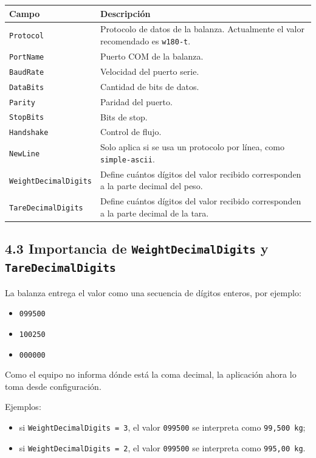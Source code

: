 \documentclass[12pt,a4paper]{article}
\begin{document}
\begin{longtable}{|>{\raggedright\arraybackslash}p{4cm}|>{\raggedright\arraybackslash}p{10cm}|}
\hline
\textbf{Campo} & \textbf{Descripci\'on} \\
\hline
\texttt{Protocol} & Protocolo de datos de la balanza. Actualmente el valor recomendado es \texttt{w180-t}. \\
\hline
\texttt{PortName} & Puerto COM de la balanza. \\
\hline
\texttt{BaudRate} & Velocidad del puerto serie. \\
\hline
\texttt{DataBits} & Cantidad de bits de datos. \\
\hline
\texttt{Parity} & Paridad del puerto. \\
\hline
\texttt{StopBits} & Bits de stop. \\
\hline
\texttt{Handshake} & Control de flujo. \\
\hline
\texttt{NewLine} & Solo aplica si se usa un protocolo por l\'inea, como \texttt{simple-ascii}. \\
\hline
\texttt{WeightDecimalDigits} & Define cu\'antos d\'igitos del valor recibido corresponden a la parte decimal del peso. \\
\hline
\texttt{TareDecimalDigits} & Define cu\'antos d\'igitos del valor recibido corresponden a la parte decimal de la tara. \\
\hline
\end{longtable}

\subsection*{4.3 Importancia de \texttt{WeightDecimalDigits} y \texttt{TareDecimalDigits}}

La balanza entrega el valor como una secuencia de d\'igitos enteros, por ejemplo:

\begin{itemize}
\item \texttt{099500}
\item \texttt{100250}
\item \texttt{000000}
\end{itemize}

Como el equipo no informa d\'onde est\'a la coma decimal, la aplicaci\'on ahora lo toma desde configuraci\'on.

Ejemplos:

\begin{itemize}
\item si \texttt{WeightDecimalDigits = 3}, el valor \texttt{099500} se interpreta como \texttt{99,500 kg};
\item si \texttt{WeightDecimalDigits = 2}, el valor \texttt{099500} se interpreta como \texttt{995,00 kg}.
\end{itemize}
\end{document}
